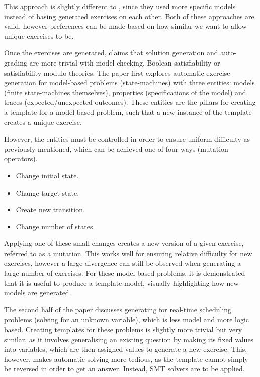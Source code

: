 \documentclass{l4proj}
\begin{document}
This approach is slightly different to \citet{Hoz21}, since they used more specific models instead of basing generated exercises on each other. Both of these approaches are valid, however preferences can be made based on how similar we want to allow unique exercises to be. 

Once the exercises are generated, \citet{Sad12} claims that solution generation and auto-grading are more trivial with model checking, Boolean satisfiability or satisfiability modulo theories. The paper first explores automatic exercise generation for model-based problems (state-machines) with three entities: models (finite state-machines themselves), properties (specifications of the model) and traces (expected/unexpected outcomes). These entities are the pillars for creating a template for a model-based problem, such that a new instance of the template creates a unique exercise. 

However, the entities must be controlled in order to ensure uniform difficulty as previously mentioned, which can be achieved one of four ways (mutation operators). 

\begin{itemize}
	\item
	Change initial state.
	\item
	Change target state.
	\item
	 Create new transition.
	\item
	 Change number of states.
\end{itemize}

Applying one of these small changes creates a new version of a given exercise, referred to as a mutation. This works well for ensuring relative difficulty for new exercises, however a large divergence can still be observed when generating a large number of exercises. For these model-based problems, it is demonstrated that it is useful to produce a template model, visually highlighting how new models are generated. 

The second half of the paper discusses generating for real-time scheduling problems (solving for an unknown variable), which is less model and more logic based. Creating templates for these problems is slightly more trivial but very similar, as it involves generalising an existing question by making its fixed values into variables, which are then assigned values to generate a new exercise. This, however, makes automatic solving more tedious, as the template cannot simply be reversed in order to get an answer. Instead, SMT solvers are to be applied.
 
\end{document}
